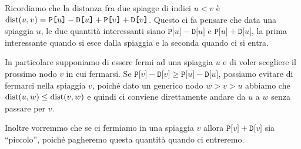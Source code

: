 \Lineare
Ricordiamo che la distanza fra due spiagge di indici $u<v$ è $\mathrm{dist}(u,v) = \texttt{P[}u \texttt{]} - \texttt{D[}u\texttt{]} + \texttt{P[}v\texttt{]}+\texttt{D[}v\texttt{]}$. Questo ci fa pensare che data una spiaggia $u$, le due quantità interessanti siano $\texttt{P[}u \texttt{]} - \texttt{D[}u\texttt{]}$ e $\texttt{P[}u \texttt{]} + \texttt{D[}u\texttt{]}$, la prima interessante quando si esce dalla spiaggia e la seconda quando ci si entra.

In particolare supponiamo di essere fermi ad una spiaggia $u$ e di voler scegliere il prossimo nodo $v$ in cui fermarsi. Se $\texttt{P[}v \texttt{]} - \texttt{D[}v\texttt{]} \ge \texttt{P[}u \texttt{]} - \texttt{D[}u\texttt{]}$, possiamo evitare di fermarci nella spiaggia $v$, poiché dato un generico nodo $w>v>u$ abbiamo che $\mathrm{dist}(u,w) \le \mathrm{dist}(v,w)$ e quindi ci conviene direttamente andare da $u$ a $w$ senza passare per $v$.

Inoltre vorremmo che se ci fermiamo in una spiaggia $v$ allora $\texttt{P[}v \texttt{]} + \texttt{D[}v\texttt{]}$ sia ``piccolo'', poiché pagheremo questa quantità quando ci entreremo.


% 	
% 	
% 	


